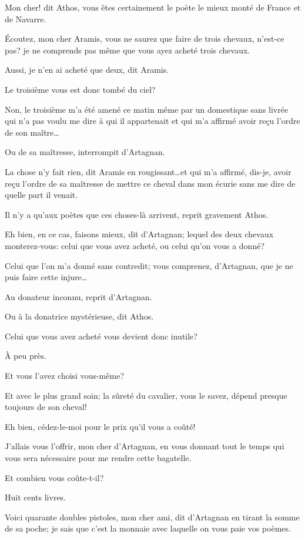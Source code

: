 \speak  Mon cher! dit Athos, vous êtes certainement le poète le mieux monté de France et de Navarre. 

\speak  Écoutez, mon cher Aramis, vous ne saurez que faire de trois chevaux, n'est-ce pas? je ne comprends pas même que vous ayez acheté trois chevaux. 

\speak  Aussi, je n'en ai acheté que deux, dit Aramis. 

\speak  Le troisième vous est donc tombé du ciel? 

\speak  Non, le troisième m'a été amené ce matin même par un domestique sans livrée qui n'a pas voulu me dire à qui il appartenait et qui m'a affirmé avoir reçu l'ordre de son maître\dots 

\speak  Ou de sa maîtresse, interrompit d'Artagnan. 

\speak  La chose n'y fait rien, dit Aramis en rougissant\dots et qui m'a affirmé, dis-je, avoir reçu l'ordre de sa maîtresse de mettre ce cheval dans mon écurie sans me dire de quelle part il venait. 

\speak  Il n'y a qu'aux poètes que ces choses-là arrivent, reprit gravement Athos. 

\speak  Eh bien, en ce cas, faisons mieux, dit d'Artagnan; lequel des deux chevaux monterez-vous: celui que vous avez acheté, ou celui qu'on vous a donné? 

\speak  Celui que l'on m'a donné sans contredit; vous comprenez, d'Artagnan, que je ne puis faire cette injure\dots 

\speak  Au donateur inconnu, reprit d'Artagnan. 

\speak  Ou à la donatrice mystérieuse, dit Athos. 

\speak  Celui que vous avez acheté vous devient donc inutile? 

\speak  À peu près. 

\speak  Et vous l'avez choisi vous-même? 

\speak  Et avec le plus grand soin; la sûreté du cavalier, vous le savez, dépend presque toujours de son cheval! 

\speak  Eh bien, cédez-le-moi pour le prix qu'il vous a coûté! 

\speak  J'allais vous l'offrir, mon cher d'Artagnan, en vous donnant tout le temps qui vous sera nécessaire pour me rendre cette bagatelle. 

\speak  Et combien vous coûte-t-il? 

\speak  Huit cents livres. 

\speak  Voici quarante doubles pistoles, mon cher ami, dit d'Artagnan en tirant la somme de sa poche; je sais que c'est la monnaie avec laquelle on vous paie vos poèmes. 

